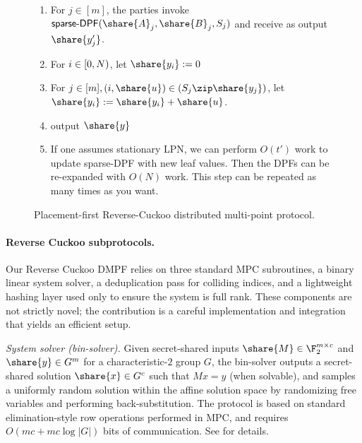 \begin{figure}[H]
{\begin{minipage}{.95\textwidth}
\begin{enumerate}
    \item For $j\in [m]$, the parties invoke $\textsf{sparse-DPF}(\share{A}_j,\share{B}_j, S_j)$ and receive as output $\share{y'_j}$.
    \item For $i\in \left[0,N\right)$, let $\share{y_i}:=0$
    \item For $j\in[m],(i,\share{u})\in (S_j\zip \share{y_j})$, let $\share{y_i}:= \share{y_i}+\share{u}$.

    \item output $\share{y}$

    \item If one assumes stationary LPN, we can perform $O(t')$ work to update \textsf{sparse-DPF} with new leaf values.
    Then the DPFs can be re-expanded with $O(N)$ work. This step can be repeated as many times as you want.
    
\end{enumerate}
    \end{minipage}}
\caption{Placement-first Reverse-Cuckoo distributed multi-point protocol.\label{fig:revCuckoo}
} 
\end{figure}


\iffull


\else
\paragraph{Reverse Cuckoo subprotocols.}
Our Reverse Cuckoo DMPF relies on three standard MPC subroutines, a binary linear system
solver, a deduplication pass for colliding indices, and a lightweight hashing layer used only to
ensure the system is full rank.
These components are not strictly novel; the contribution is a careful implementation and integration
that yields an efficient setup.

\emph{System solver (bin-solver).}
Given secret-shared inputs $\share{M} \in \F_2^{m \times c}$ and $\share{y} \in G^m$ for a characteristic-$2$ group $G$,
the bin-solver outputs a secret-shared solution $\share{x} \in G^c$ such that $Mx=y$ (when solvable),
and samples a uniformly random solution within the affine solution space by randomizing free
variables and performing back-substitution. The protocol is based on standard elimination-style
row operations performed in MPC, and requires $O(mc+mc\log |G|)$ bits of communication. See  for details.

